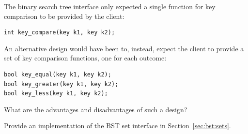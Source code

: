 \begin{exercise}
  The binary search tree interface only expected a single function for
  key comparison to be provided by the client:
\begin{lstlisting}[language={[C0]C}]
int key_compare(key k1, key k2);
\end{lstlisting}
  An alternative design would have been to, instead, expect the client
  to provide a set of key comparison functions, one for each outcome:
\begin{lstlisting}[language={[C0]C}]
bool key_equal(key k1, key k2);
bool key_greater(key k1, key k2);
bool key_less(key k1, key k2);
\end{lstlisting}
  What are the advantages and disadvantages of such a design?
\end{exercise}

\begin{exercise}
  Provide an implementation of the BST set interface in
  Section~\ref{sec:bst:sets}.
\end{exercise}

\printsolutions
% 
% 
